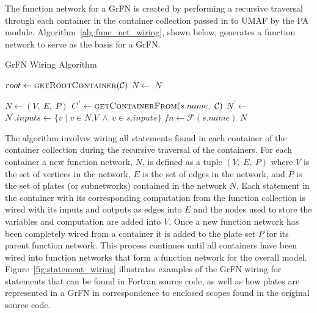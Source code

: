 The function network for a GrFN is created by performing a recursive traversal through each container in the container collection passed in to UMAF by the PA module.
Algorithm~\ref{alg:func_net_wiring}, shown below, generates a function network to serve as the basis for a GrFN.

\FloatBarrier
\begin{algorithm}
  \caption{GrFN Wiring Algorithm}
  \label{alg:func_net_wiring}
  \begin{algorithmic}[1]
     
    \State $root \gets \Call{getRootContainer}{\mathcal{C}}$
    \State $N \gets$ 
    \State \Return $N$
    \EndProcedure

     
      \State $N \gets (V,~E,~P)$
       
         
          \State $C^{'} \gets \Call{getContainerFrom}{s.name,~\mathcal{C}}$
          \State $N^{'} \gets$ 
          \State $N^{'}.inputs \gets \{ v \mid v \in N.V ~\land~ v \in s.inputs \}$
            \State {}
            \State {}
          \EndFor
          \State {}
        \Else {}
          \State $fn \gets \mathcal{F}(s.name)$
          \State {}
          \State {}
          \State {}
            \State {}
            \State {}
          \EndFor
        \EndIf
      \EndFor
      \State \Return $N$
    \EndProcedure
  \end{algorithmic}
\end{algorithm}
\FloatBarrier

The algorithm involves wiring all statements found in each container of the container collection during the recursive traversal of the containers.
For each container a new function network, $N$, is defined as a tuple $(V,~E,~P)$ where $V$ is the set of vertices in the network, $E$ is the set of edges in the network, and $P$ is the set of plates (or subnetworks) contained in the network $N$.
Each statement in the container with its corresponding computation from the function collection is wired with its inputs and outputs as edges into $E$ and the nodes used to store the variables and computation are added into $V$.
Once a new function network has been completely wired from a container it is added to the plate set $P$ for its parent function network.
This process continues until all containers have been wired into function networks that form a function network for the overall model.
Figure~\ref{fig:statement_wiring} illustrates examples of the GrFN wiring for statements that can be found in Fortran source code, as well as how plates are represented in a GrFN in correspondence to enclosed scopes found in the original source code.

